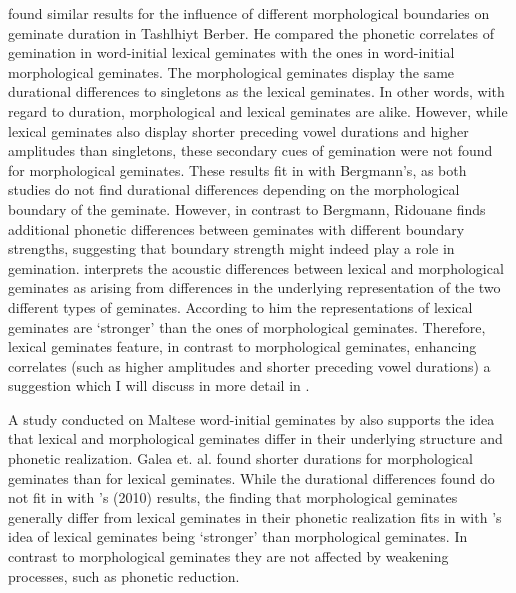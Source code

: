 \cite{Ridouane.2010} found similar results for the influence of different morphological boundaries on geminate duration in Tashlhiyt Berber. He compared the phonetic correlates of gemination in word-initial lexical geminates with the ones in word-initial morphological geminates. The morphological geminates display the same durational differences to singletons as the lexical geminates. In other words, with regard to duration, morphological and lexical geminates are alike. However, while lexical geminates also display shorter preceding vowel durations and higher amplitudes than singletons, these secondary cues of gemination were not found for morphological geminates. These results fit in with Bergmann's, as both studies do not find durational differences depending on the morphological boundary of the geminate. However, in contrast to Bergmann, Ridouane finds additional phonetic differences between geminates with different boundary strengths, suggesting that boundary strength might indeed play a role in gemination. 
\cite{Ridouane.2010} interprets the acoustic differences between lexical and morphological geminates as arising from differences in the underlying representation of the two different types of geminates.  According to him the representations of lexical geminates are ‘stronger' than the ones of morphological geminates. Therefore, lexical geminates feature, in contrast to morphological geminates, enhancing correlates (such as higher amplitudes and shorter preceding vowel durations)  \textendash a suggestion which I will discuss in more detail in . 

A study conducted on Maltese word-initial geminates by \cite{Galea.2014} also supports the idea that lexical and morphological geminates differ in their underlying structure and phonetic realization. Galea et. al. found shorter durations for morphological geminates than for lexical geminates. While the durational differences found do not fit in with \citeauthor{Ridouane.2010}'s (2010) results, the finding that morphological geminates generally differ from lexical geminates in their phonetic realization fits in with \citeauthor{Ridouane.2010}'s idea of lexical geminates being `stronger' than morphological geminates. In contrast to morphological geminates they are not affected by weakening processes, such as phonetic reduction. 

